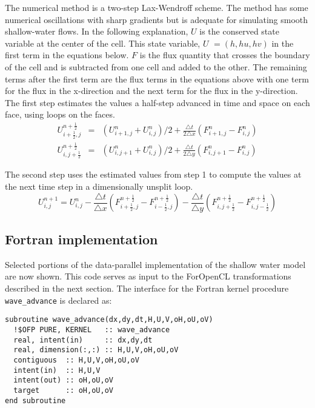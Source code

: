 The numerical method is a two-step Lax-Wendroff scheme. The method
has some numerical oscillations with sharp gradients but is adequate
for simulating smooth shallow-water flows. In the following explanation,
$U$ is the conserved state variable at the center of the cell. This
state variable, $U$ $=(h,hu,hv)$ in the first term in the equations
below. $F$ is the flux quantity that crosses the boundary of the cell
and is subtracted from one cell and added to the other. The remaining
terms after the first term are the flux terms in the equations above
with one term for the flux in the x-direction and the next term for
the flux in the y-direction. The first step estimates the values a
half-step advanced in time and space on each face, using loops on
the faces.\begin{eqnarray*}
U_{i+\frac{1}{2},j}^{n+\frac{1}{2}} & = & (U_{i+1,j}^{n}+U_{i,j}^{n})/2+\frac{\triangle t}{2\triangle x}\left(F_{i+1,j}^{n}-F_{i,j}^{n}\right)\\
U_{i,j+\frac{1}{2}}^{n+\frac{1}{2}} & = & (U_{i,j+1}^{n}+U_{i,j}^{n})/2+\frac{\triangle t}{2\triangle y}\left(F_{i,j+1}^{n}-F_{i,j}^{n}\right)\end{eqnarray*}


The second step uses the estimated values from step 1 to compute the
values at the next time step in a dimensionally unsplit loop.\[
U_{i,j}^{n+1}=U_{i,j}^{n}-\frac{\triangle t}{\triangle x}(F_{i+\frac{1}{2},j}^{n+\frac{1}{2}}-F_{i-\frac{1}{2},j}^{n+\frac{1}{2}})-\frac{\triangle t}{\triangle y}(F_{i,j+\frac{1}{2}}^{n+\frac{1}{2}}-F_{i,j-\frac{1}{2}}^{n+\frac{1}{2}})\]


\subsection{Fortran implementation}

Selected portions of the data-parallel implementation of the shallow water model
are now shown.  This code serves as input to the ForOpenCL transformations
described in the next section.  The interface for the Fortran kernel procedure {\tt
  wave\_advance} is declared as:

{\small
\begin{verbatim}
subroutine wave_advance(dx,dy,dt,H,U,V,oH,oU,oV)
  !$OFP PURE, KERNEL   :: wave_advance
  real, intent(in)     :: dx,dy,dt
  real, dimension(:,:) :: H,U,V,oH,oU,oV
  contiguous  :: H,U,V,oH,oU,oV
  intent(in)  :: H,U,V
  intent(out) :: oH,oU,oV
  target      :: oH,oU,oV
end subroutine
\end{verbatim}
}

